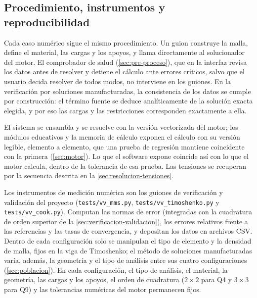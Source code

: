 \subsection{Procedimiento, instrumentos y reproducibilidad}
\label{sec:validacion-datos}

Cada caso numérico sigue el mismo procedimiento. Un guion construye la malla, define el material, las cargas y los apoyos, y llama directamente al solucionador del motor. El comprobador de salud (\autoref{sec:pre-proceso}), que en la interfaz revisa los datos antes de resolver y detiene el cálculo ante errores críticos, salvo que el usuario decida resolver de todos modos, no interviene en los guiones. En la verificación por soluciones manufacturadas, la consistencia de los datos se cumple por construcción: el término fuente se deduce analíticamente de la solución exacta elegida, y por eso las cargas y las restricciones corresponden exactamente a ella.

El sistema se ensambla y se resuelve con la versión vectorizada del motor; los módulos educativos y la memoria de cálculo exponen el cálculo con su versión legible, elemento a elemento, que una prueba de regresión mantiene coincidente con la primera (\autoref{sec:motor}). Lo que el software expone coincide así con lo que el motor calcula, dentro de la tolerancia de esa prueba. Las tensiones se recuperan por la secuencia descrita en la \autoref{sec:resolucion-tensiones}.

Los instrumentos de medición numérica son los guiones de verificación y validación del proyecto (\texttt{tests/vv\_mms.py}, \texttt{tests/vv\_timoshenko.py} y \texttt{tests/vv\_cook.py}). Computan las normas de error (integradas con la cuadratura de orden superior de la \autoref{sec:verificacion-validacion}), los errores relativos frente a las referencias y las tasas de convergencia, y depositan los datos en archivos CSV. Dentro de cada configuración solo se manipulan el tipo de elemento y la densidad de malla, fijos en la viga de Timoshenko; el método de soluciones manufacturadas varía, además, la geometría y el tipo de análisis entre sus cuatro configuraciones (\autoref{sec:poblacion}). En cada configuración, el tipo de análisis, el material, la geometría, las cargas y los apoyos, el orden de cuadratura ($2\times2$ para Q4 y $3\times3$ para Q9) y las tolerancias numéricas del motor permanecen fijos.

